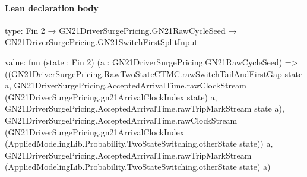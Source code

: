 \documentclass[10pt]{article}
\begin{document}
\paragraph{Lean declaration body}
\begin{ReviewVerbatim}
type:
Fin 2 → GN21DriverSurgePricing.GN21RawCycleSeed → GN21DriverSurgePricing.GN21SwitchFirstSplitInput

value:
fun (state : Fin 2) (a : GN21DriverSurgePricing.GN21RawCycleSeed) =>
  ((GN21DriverSurgePricing.RawTwoStateCTMC.rawSwitchTailAndFirstGap state a,
      GN21DriverSurgePricing.AcceptedArrivalTime.rawClockStream (GN21DriverSurgePricing.gn21ArrivalClockIndex state) a,
      GN21DriverSurgePricing.AcceptedArrivalTime.rawTripMarkStream state a),
    GN21DriverSurgePricing.AcceptedArrivalTime.rawClockStream
      (GN21DriverSurgePricing.gn21ArrivalClockIndex (AppliedModelingLib.Probability.TwoStateSwitching.otherState state))
      a,
    GN21DriverSurgePricing.AcceptedArrivalTime.rawTripMarkStream
      (AppliedModelingLib.Probability.TwoStateSwitching.otherState state) a)
\end{ReviewVerbatim}
\end{document}
